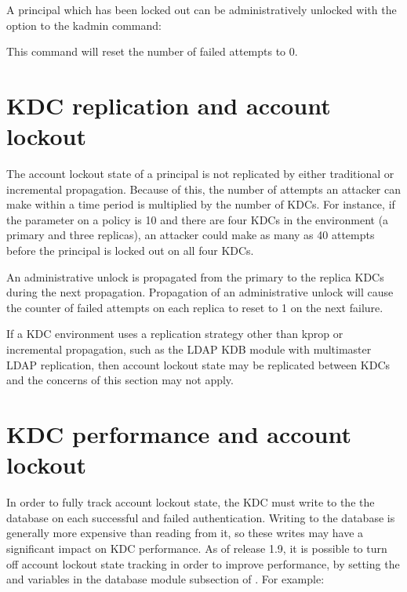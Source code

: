 \documentclass[letterpaper,10pt,english]{sphinxmanual}
\begin{document}
\sphinxAtStartPar
A principal which has been locked out can be administratively unlocked
with the  option to the  kadmin command:

\begin{sphinxVerbatim}[commandchars=\\\{\}]
   
\end{sphinxVerbatim}

\sphinxAtStartPar
This command will reset the number of failed attempts to 0.


\section{KDC replication and account lockout}
\label{\detokenize{admin/lockout:kdc-replication-and-account-lockout}}
\sphinxAtStartPar
The account lockout state of a principal is not replicated by either
traditional {\hyperref[\detokenize{admin/admin_commands/kprop:kprop-8}]{}} or incremental propagation.  Because of
this, the number of attempts an attacker can make within a time period
is multiplied by the number of KDCs.  For instance, if the
 parameter on a policy is 10 and there are four KDCs in
the environment (a primary and three replicas), an attacker could make
as many as 40 attempts before the principal is locked out on all four
KDCs.

\sphinxAtStartPar
An administrative unlock is propagated from the primary to the replica
KDCs during the next propagation.  Propagation of an administrative
unlock will cause the counter of failed attempts on each replica to
reset to 1 on the next failure.

\sphinxAtStartPar
If a KDC environment uses a replication strategy other than kprop or
incremental propagation, such as the LDAP KDB module with multi\sphinxhyphen{}master
LDAP replication, then account lockout state may be replicated between
KDCs and the concerns of this section may not apply.


\section{KDC performance and account lockout}
\label{\detokenize{admin/lockout:kdc-performance-and-account-lockout}}\label{\detokenize{admin/lockout:disable-lockout}}
\sphinxAtStartPar
In order to fully track account lockout state, the KDC must write to
the the database on each successful and failed authentication.
Writing to the database is generally more expensive than reading from
it, so these writes may have a significant impact on KDC performance.
As of release 1.9, it is possible to turn off account lockout state
tracking in order to improve performance, by setting the
 and  variables in the
database module subsection of {\hyperref[\detokenize{admin/conf_files/kdc_conf:kdc-conf-5}]{}}.  For example:
\end{document}
